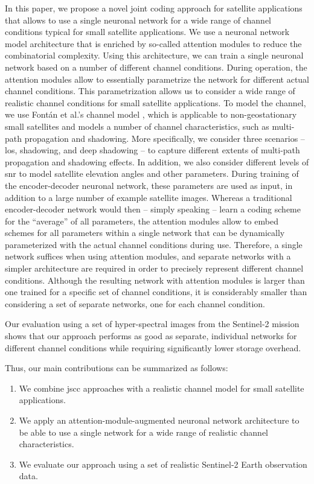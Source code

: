 \documentclass[conference]{IEEEtran}
\newcommand\sentinelii{Sentinel-2\xspace}
\begin{document}
In this paper, we propose a novel joint coding approach for satellite applications that allows to use a single neuronal network for a wide range of channel conditions typical for small satellite applications.
We use a neuronal network model architecture that is enriched by so-called attention modules to reduce the combinatorial complexity.
Using this architecture, we can train a single neuronal network based on a number of different channel conditions.
During operation, the attention modules allow to essentially parametrize the network for different actual channel conditions.
This parametrization allows us to consider a wide range of realistic channel conditions for small satellite applications.
To model the channel, we use Fontán et al.'s channel model \cite{fontan2001}, which is applicable to non-geostationary small satellites and models a number of channel characteristics, such as multi-path propagation and shadowing.
More specifically, we consider three scenarios -- \ac{los}, shadowing, and deep shadowing -- to capture different extents of multi-path propagation and shadowing effects.
In addition, we also consider different levels of \ac{snr} to model satellite elevation angles and other parameters.
During training of the encoder-decoder neuronal network, these parameters are used as input, in addition to a large number of example satellite images.
Whereas a traditional encoder-decoder network would then -- simply speaking -- learn a coding scheme for the \enquote{average} of all parameters, the attention modules allow to embed schemes for all parameters within a single network that can be dynamically parameterized with the actual channel conditions during use.
Therefore, a single network suffices when using attention modules, and separate networks with a simpler architecture are required in order to precisely represent different channel conditions.
Although the resulting network with attention modules is larger than one trained for a specific set of channel conditions, it is considerably smaller than considering a set of separate networks, one for each channel condition.

Our evaluation using a set of hyper-spectral images from the \sentinelii mission shows that our approach performs as good as separate, individual networks for different channel conditions while requiring significantly lower storage overhead.

Thus, our main contributions can be summarized as follows:
%
\begin{enumerate}
  \item We combine \ac{jscc} approaches with a realistic channel model for small satellite applications.
  \item We apply an attention-module-augmented neuronal network architecture to be able to use a single network for a wide range of realistic channel characteristics.
  \item We evaluate our approach using a set of realistic \sentinelii Earth observation data.
\end{enumerate}
\end{document}
